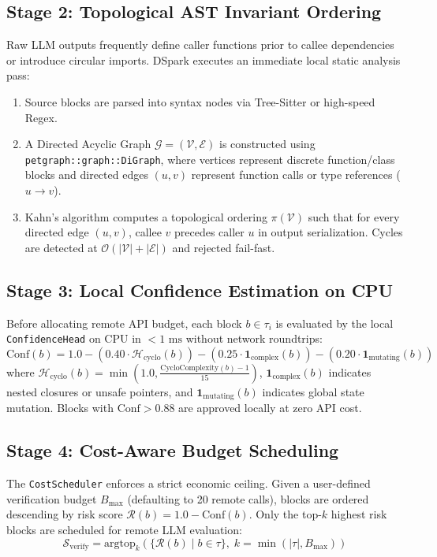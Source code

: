 \documentclass[10pt,twocolumn,letterpaper]{article}
\begin{document}
\subsection{Stage 2: Topological AST Invariant Ordering}
Raw LLM outputs frequently define caller functions prior to callee dependencies or introduce circular imports. DSpark executes an immediate local static analysis pass:
\begin{enumerate}
    \item Source blocks are parsed into syntax nodes via Tree-Sitter or high-speed Regex.
    \item A Directed Acyclic Graph $\mathcal{G} = (\mathcal{V}, \mathcal{E})$ is constructed using \texttt{petgraph::graph::DiGraph}, where vertices represent discrete function/class blocks and directed edges $(u, v)$ represent function calls or type references ($u \to v$).
    \item Kahn's algorithm computes a topological ordering $\pi(\mathcal{V})$ such that for every directed edge $(u, v)$, callee $v$ precedes caller $u$ in output serialization. Cycles are detected at $\mathcal{O}(|\mathcal{V}| + |\mathcal{E}|)$ and rejected fail-fast.
\end{enumerate}

\subsection{Stage 3: Local Confidence Estimation on CPU}
Before allocating remote API budget, each block $b \in \tau_i$ is evaluated by the local \texttt{ConfidenceHead} on CPU in $< 1\text{ ms}$ without network roundtrips:
\begin{equation}
\mathrm{Conf}(b) = 1.0 - (0.40 \cdot \mathcal{H}_{\mathrm{cyclo}}(b)) - (0.25 \cdot \mathbf{1}_{\mathrm{complex}}(b)) - (0.20 \cdot \mathbf{1}_{\mathrm{mutating}}(b))
\end{equation}
where $\mathcal{H}_{\mathrm{cyclo}}(b) = \min(1.0, \frac{\mathrm{CycloComplexity}(b) - 1}{15})$, $\mathbf{1}_{\mathrm{complex}}(b)$ indicates nested closures or unsafe pointers, and $\mathbf{1}_{\mathrm{mutating}}(b)$ indicates global state mutation. Blocks with $\mathrm{Conf} > 0.88$ are approved locally at zero API cost.

\subsection{Stage 4: Cost-Aware Budget Scheduling}
The \texttt{CostScheduler} enforces a strict economic ceiling. Given a user-defined verification budget $B_{\text{max}}$ (defaulting to 20 remote calls), blocks are ordered descending by risk score $\mathcal{R}(b) = 1.0 - \text{Conf}(b)$. Only the top-$k$ highest risk blocks are scheduled for remote LLM evaluation:
\begin{equation}
\mathcal{S}_{\text{verify}} = \mathrm{argtop}_k \left( \{ \mathcal{R}(b) \mid b \in \tau \}, \; k = \min(|\tau|, B_{\text{max}}) \right)
\end{equation}
\end{document}
